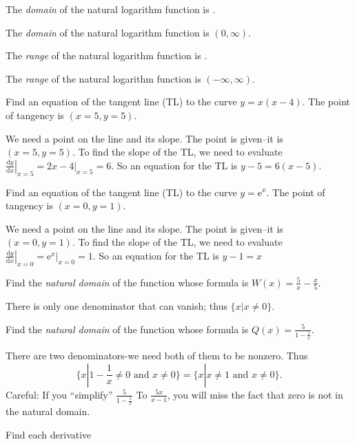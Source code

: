 \documentclass[12pt, answers,fleqn]{exam}
\begin{document}
\begin{questions}
\question The \emph{domain} of the natural logarithm function is \underline{\phantom{xxxxxxxxx}}.
\begin{solution}
    The \emph{domain} of the natural logarithm function is  \((0,\infty)\).
\end{solution}
\question The \emph{range} of the natural logarithm function is    \underline{\phantom{xxxxxxxxx}}.
\begin{solution}
    The \emph{range} of the natural logarithm function is $(-\infty, \infty)$.
\end{solution}
\question Find an equation of the tangent line (TL) to the curve  $y = x (x-4)$. 
The point of tangency is $(x= 5, y=5)$.
\begin{solution}
    We need a point on the line and its slope.  The point is given--it is \mbox{$(x= 5, y=5)$}.
    To find the slope of the TL, we need to evaluate $\displaystyle
    \left. \frac{\mathrm{d}y}{\mathrm{d}x} \right \vert_{x=5} = 
    \left. 2x - 4\right \vert_{x=5}  = 6.$ So an equation for the TL is $y-5 = 6(x-5)$.
    
\end{solution}
\question Find an equation of the tangent line (TL) to the curve $y = \mathrm{e}^x$. 
The point of tangency is $(x= 0, y=1)$.
\begin{solution}
    We need a point on the line and its slope.  The point is given--it is \mbox{$(x= 0, y=1)$}.
    To find the slope of the TL, we need to evaluate $\displaystyle
    \left. \frac{\mathrm{d}y}{\mathrm{d}x} \right \vert_{x=0} = 
    \left. \mathrm{e}^x \right \vert_{x=0}  = 1.$ So an equation for the 
    TL is $y-1 = x$
    
\end{solution}

\question Find the \emph{natural domain} of the function whose formula is $W(x) = \frac{5}{x} - \frac{x}{5}$.
\begin{solution}
    There is only one denominator that can vanish; thus
    \(
     \{x | x \neq 0 \}.
    \)
    
\end{solution}

\question Find the \emph{natural domain} of the function whose formula is 
$Q(x) = \frac{5}{1 - \frac{1}{x}} $.
\begin{solution}
    There are two denominators-we need both of them to be nonzero. Thus
    \[
         \{x |   1 - \frac{1}{x} \neq 0 \mbox{ and } x \neq 0 \}
       =  \{x |   x \neq 1 \mbox{ and } x \neq 0 \}.
    \]
    Careful: If you ``simplify'' $\frac{5}{1 - \frac{1}{x}}$ To
    $\frac{5x}{x - 1}$, you will miss the fact that zero is 
    not in the natural domain.  
\end{solution}
\question Find each derivative


\end{questions}
\end{document}
